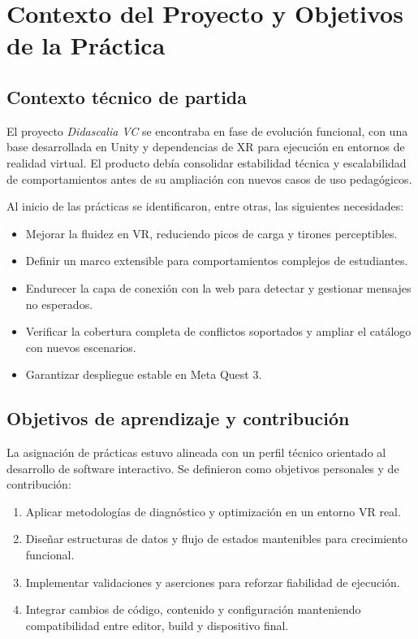 \section{Contexto del Proyecto y Objetivos de la Práctica}

\subsection{Contexto técnico de partida}
El proyecto \textit{Didascalia VC} se encontraba en fase de evolución funcional, con una base desarrollada en Unity y dependencias de XR para ejecución en entornos de realidad virtual. El producto debía consolidar estabilidad técnica y escalabilidad de comportamientos antes de su ampliación con nuevos casos de uso pedagógicos.\par

Al inicio de las prácticas se identificaron, entre otras, las siguientes necesidades:
\begin{itemize}[leftmargin=1.5em]
    \item Mejorar la fluidez en VR, reduciendo picos de carga y tirones perceptibles.
    \item Definir un marco extensible para comportamientos complejos de estudiantes.
    \item Endurecer la capa de conexión con la web para detectar y gestionar mensajes no esperados.
    \item Verificar la cobertura completa de conflictos soportados y ampliar el catálogo con nuevos escenarios.
    \item Garantizar despliegue estable en Meta Quest 3.
\end{itemize}

\subsection{Objetivos de aprendizaje y contribución}
La asignación de prácticas estuvo alineada con un perfil técnico orientado al desarrollo de software interactivo. Se definieron como objetivos personales y de contribución:
\begin{enumerate}[leftmargin=1.5em]
    \item Aplicar metodologías de diagnóstico y optimización en un entorno VR real.
    \item Diseñar estructuras de datos y flujo de estados mantenibles para crecimiento funcional.
    \item Implementar validaciones y aserciones para reforzar fiabilidad de ejecución.
    \item Integrar cambios de código, contenido y configuración manteniendo compatibilidad entre editor, build y dispositivo final.
\end{enumerate}

